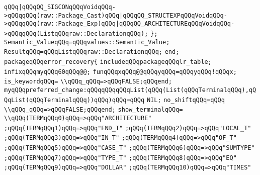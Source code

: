\verb|qQQq|\verb#|qQQqQQ_SIGCONqQQqVoidqQQq->qQQqqQQq(raw::Package_Cast)qQQq|qQQqQQ_STRUCTEXPqQQqVoidqQQq->qQQqqQQq(raw::Package_Exp)qQQq|qQQqQQ_ARCHITECTUREqQQqVoidqQQq->qQQqqQQq(ListqQQqraw::DeclarationqQQq);#\newline
\verb|};|\newline
\verb|Semantic_ValueqQQq=qQQqvalues::Semantic_Value;|\newline
\verb|ResultqQQq=qQQqListqQQqraw::DeclarationqQQq;|\newline
\verb|end;|\newline
\verb|packageqQQqerror_recovery{|\newline
\verb|includeqQQqpackageqQQqlr_table;|\newline
\verb|infixqQQqmyqQQq60qQQq@@;|\newline
\verb|funqQQqxqQQq@@qQQqyqQQq=qQQqyqQQq!qQQqx;|\newline
\verb|is_keywordqQQq=|\newline
\verb|\\qQQq_qQQq=>qQQqFALSE;qQQqend;|\newline
\verb|myqQQqpreferred_change:qQQqqQQqqQQqList(qQQq(List(qQQqTerminalqQQq),qQQqList(qQQqTerminalqQQq))qQQq)qQQq=qQQq|\newline
\verb|NIL;|\newline
\verb|no_shiftqQQq=qQQq|\newline
\verb|\\qQQq_qQQq=>qQQqFALSE;qQQqend;|\newline
\verb|show_terminalqQQq=|\newline
\verb|\\qQQq(TERMqQQq0)qQQq=>qQQq"ARCHITECTURE"|\newline
\verb|;qQQq(TERMqQQq1)qQQq=>qQQq"END_T"|\newline
\verb|;qQQq(TERMqQQq2)qQQq=>qQQq"LOCAL_T"|\newline
\verb|;qQQq(TERMqQQq3)qQQq=>qQQq"IN_T"|\newline
\verb|;qQQq(TERMqQQq4)qQQq=>qQQq"OF_T"|\newline
\verb|;qQQq(TERMqQQq5)qQQq=>qQQq"CASE_T"|\newline
\verb|;qQQq(TERMqQQq6)qQQq=>qQQq"SUMTYPE"|\newline
\verb|;qQQq(TERMqQQq7)qQQq=>qQQq"TYPE_T"|\newline
\verb|;qQQq(TERMqQQq8)qQQq=>qQQq"EQ"|\newline
\verb|;qQQq(TERMqQQq9)qQQq=>qQQq"DOLLAR"|\newline
\verb|;qQQq(TERMqQQq10)qQQq=>qQQq"TIMES"|\newline
